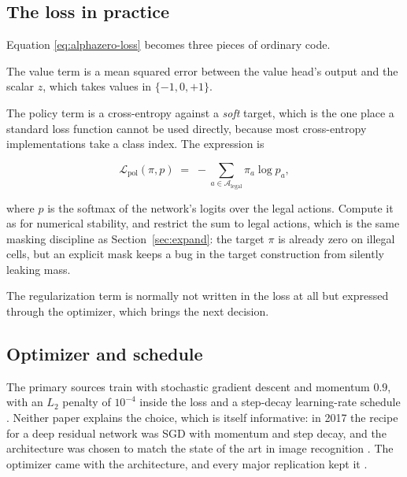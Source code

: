 \subsection{The loss in practice}
\label{sec:loss-practice}

Equation \eqref{eq:alphazero-loss} becomes three pieces of ordinary code.

The value term is a mean squared error between the value head's output and the
scalar $z$, which takes values in $\{-1,0,+1\}$.

The policy term is a cross-entropy against a \emph{soft} target, which is the one
place a standard loss function cannot be used directly, because most
cross-entropy implementations take a class index. The expression is

\begin{equation}
\mathcal{L}_{\text{pol}}(\pi, p) \;=\; - \sum_{a \in \mathcal{A}_{\text{legal}}}
\pi_a \log p_a ,
\end{equation}

where $p$ is the softmax of the network's logits over the legal actions. Compute
it as  for numerical stability, and
restrict the sum to legal actions, which is the same masking discipline as
Section~\ref{sec:expand}: the target $\pi$ is already zero on illegal cells, but
an explicit mask keeps a bug in the target construction from silently leaking
mass.

The regularization term is normally not written in the loss at all but expressed
through the optimizer, which brings the next decision.

\subsection{Optimizer and schedule}
\label{sec:optimizer}

The primary sources train with stochastic gradient descent and momentum $0.9$,
with an $L_2$ penalty of $10^{-4}$ inside the loss and a step-decay learning-rate
schedule \citep{silver2017alphagozero,silver2018alphazero}.
Neither paper explains the choice, which is itself informative: in 2017 the
recipe for a deep residual network was SGD with momentum and step decay, and the
architecture was chosen to match the state of the art in image recognition
\citep{he2016resnet}. The optimizer came with the architecture, and every major
replication kept it \citep{tian2019elf,wu2019katago}.

